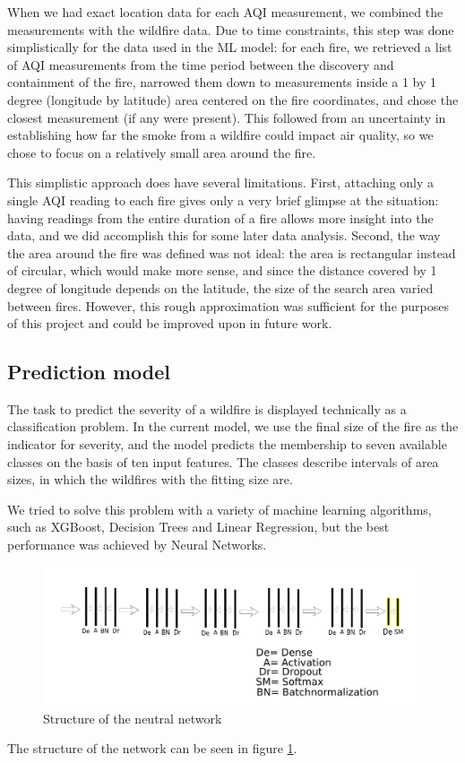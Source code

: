 \documentclass[a4paper,12pt]{article}
\begin{document}
When we had exact location data for each AQI measurement, we combined the measurements with the wildfire data. Due to time constraints, this step was done simplistically for the data used in the ML model: for each fire, we retrieved a list of AQI measurements from the time period between the discovery and containment of the fire, narrowed them down to measurements inside a 1 by 1 degree (longitude by latitude) area centered on the fire coordinates, and chose the closest measurement (if any were present). This followed from an uncertainty in establishing how far the smoke from a wildfire could impact air quality, so we chose to focus on a relatively small area around the fire.

This simplistic approach does have several limitations. First, attaching only a single AQI reading to each fire gives only a very brief glimpse at the situation: having readings from the entire duration of a fire allows more insight into the data, and we did accomplish this for some later data analysis. Second, the way the area around the fire was defined was not ideal: the area is rectangular instead of circular, which would make more sense, and since the distance covered by 1 degree of longitude depends on the latitude, the size of the search area varied between fires. However, this rough approximation was sufficient for the purposes of this project and could be improved upon in future work.

\subsection{Prediction model}

The task to predict the severity of a wildfire is displayed technically as a classification problem. In the current model, we use the final size of the fire as the indicator for severity, and the model predicts the membership to seven available classes on the basis of ten input features. The classes describe intervals of area sizes, in which the wildfires with the fitting size are.

We tried to solve this problem with a variety of machine learning algorithms, such as XGBoost, Decision Trees and Linear Regression, but the best performance was achieved by Neural Networks.

\begin{figure}[t]
	\centering	
	\includegraphics[scale=0.65]{nn.pdf}	
	\caption[Strukture of the neutral network]{Structure of the neutral network}
	\label{network_structure}
\end{figure}
The structure of the network can be seen in figure \ref{network_structure}.
\end{document}
